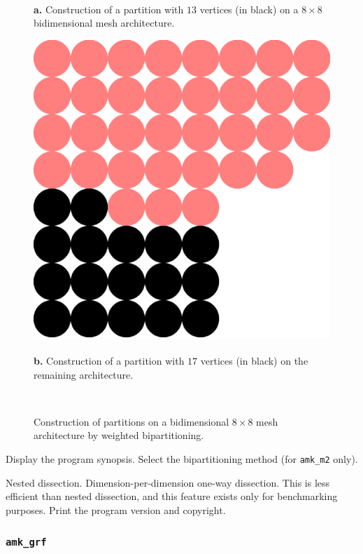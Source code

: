 \begin{itemize}
\begin{figure}[hbt]
{\hfill\ \\
{\bf a.} Construction of a partition with $13$ vertices (in black)
on a $8\times 8$ bidimensional mesh architecture.
}\ \hfill\
\parbox[t]{5.8cm}{
\hfill
\includegraphics[scale=0.25]{s_f_do2.ps}
\hfill\ \\
{\bf b.} Construction of a partition with $17$ vertices (in black)
on the remaining architecture.
}\hfill\
\caption%
{Construction of partitions on a bidimensional $8\times 8$ mesh architecture
 by weighted bipartitioning.}
\label{fig-biparch}
\end{figure}

\progopt
\begin{itemize}
\iteme[\texttt{-h}]
Display the program synopsis.
Select the bipartitioning method (for \texttt{amk\_m2} only).
\begin{itemize}
\iteme[\texttt{n}]
Nested dissection.
\iteme[\texttt{o}]
Dimension-per-dimension one-way dissection. This is less efficient
than nested dissection, and this feature exists only for benchmarking
purposes.
\iteme[\texttt{-V}]
Print the program version and copyright.
\end{itemize}
\end{itemize}
\end{itemize}

\subsubsection{\texttt{amk\_grf}}
\label{sec-prog-amkgrf}

